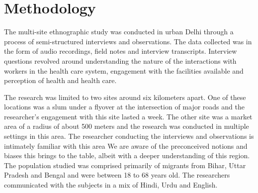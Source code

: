 \section{Methodology}

\begin{comment}
This should tell the story of what you did, and the single most important point is to show that you were reflective, rigorous, ethical, sound in your research. 
Start with where you conducted the study. Was there one site or many? How long was your (the authors’) engagement with this site? What was the nature of the engagement? And remember to anonymize by default.
Say what methods you used and who you studied. How long were your interviews? What kinds of questions did you ask? Did you use an interpreter? Who were these people? How old?
Add a paragraph on who the authors are and what they bring to the table. Say what their biases might have been that could be limitations of this work. Was there access you could not get? 
How did you analyze the data? If you used grounded theory, whose version of grounded theory did you use? Who was responsible for the analysis? 
Finally, there are lots of papers that have a decent write-up for methodology. Find a researcher you like and read up on the Methodology section.
\end{comment}

The multi-site ethnographic study was conducted in urban Delhi through a process of semi-structured interviews and observations. The data collected was in the form of audio recordings, field notes and interview transcripts. Interview questions revolved around understanding the nature of the interactions with workers in the health care system, engagement with the facilities available and perception of health and health care.

The research was limited to two sites around six kilometers apart. One of these locations was a slum under a flyover at the intersection of major roads and the researcher's engagement with this site lasted a week. The other site was a market area of a radius of about 500 meters and the research was conducted in multiple settings in this area. 
The researcher conducting the interviews and observations is intimately familiar with this area %
We are aware of the preconceived notions and biases this brings to the table, albeit with a deeper understanding of this region. The population studied was comprised primarily of migrants from Bihar, Uttar Pradesh and Bengal
and were between 18 to 68 years old. The researchers communicated with the subjects in a mix of Hindi, Urdu and English.

